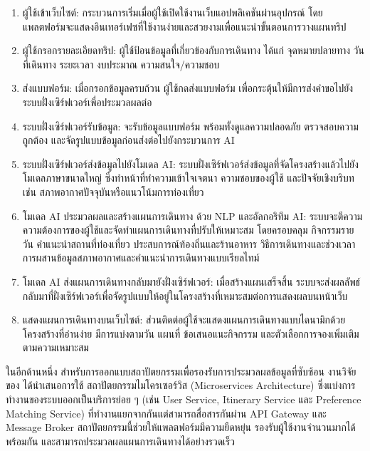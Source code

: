 \begin{enumerate}[label=(\arabic*),leftmargin=0pt,itemindent=\dimexpr\parindent+\parenlabelwidth+1em\relax,align=right,labelwidth=\parenlabelwidth,labelsep=1em]
\item ผู้ใช้เข้าเว็บไซต์: กระบวนการเริ่มเมื่อผู้ใช้เปิดใช้งานเว็บแอปพลิเคชันผ่านอุปกรณ์ โดยแพลตฟอร์มจะแสดงอินเทอร์เฟซที่ใช้งานง่ายและสวยงามเพื่อแนะนำขั้นตอนการวางแผนทริป
\item ผู้ใช้กรอกรายละเอียดทริป: ผู้ใช้ป้อนข้อมูลที่เกี่ยวข้องกับการเดินทาง ได้แก่ จุดหมายปลายทาง วันที่เดินทาง ระยะเวลา งบประมาณ ความสนใจ/ความชอบ
\item ส่งแบบฟอร์ม: เมื่อกรอกข้อมูลครบถ้วน ผู้ใช้กดส่งแบบฟอร์ม เพื่อกระตุ้นให้มีการส่งคำขอไปยังระบบฝั่งเซิร์ฟเวอร์เพื่อประมวลผลต่อ
\item ระบบฝั่งเซิร์ฟเวอร์รับข้อมูล: จะรับข้อมูลแบบฟอร์ม พร้อมทั้งดูแลความปลอดภัย ตรวจสอบความถูกต้อง และจัดรูปแบบข้อมูลก่อนส่งต่อไปยังกระบวนการ AI
\item ระบบฝั่งเซิร์ฟเวอร์ส่งข้อมูลไปยังโมเดล AI: ระบบฝั่งเซิร์ฟเวอร์ส่งข้อมูลที่จัดโครงสร้างแล้วไปยังโมเดลภาษาขนาดใหญ่ ซึ่งทำหน้าที่ทำความเข้าใจเจตนา ความชอบของผู้ใช้ และปัจจัยเชิงบริบท เช่น สภาพอากาศปัจจุบันหรือแนวโน้มการท่องเที่ยว
\item โมเดล AI ประมวลผลและสร้างแผนการเดินทาง ด้วย NLP และอัลกอริทึม AI: ระบบจะตีความความต้องการของผู้ใช้และจัดทำแผนการเดินทางที่ปรับให้เหมาะสม โดยครอบคลุม กิจกรรมรายวัน คำแนะนำสถานที่ท่องเที่ยว ประสบการณ์ท้องถิ่นและร้านอาหาร วิธีการเดินทางและช่วงเวลา การผสานข้อมูลสภาพอากาศและคำแนะนำการเดินทางแบบเรียลไทม์
\item โมเดล AI ส่งแผนการเดินทางกลับมายังฝั่งเซิร์ฟเวอร์: เมื่อสร้างแผนเสร็จสิ้น ระบบจะส่งผลลัพธ์กลับมาที่ฝั่งเซิร์ฟเวอร์เพื่อจัดรูปแบบให้อยู่ในโครงสร้างที่เหมาะสมต่อการแสดงผลบนหน้าเว็บ
\item แสดงแผนการเดินทางบนเว็บไซต์: ส่วนติดต่อผู้ใช้จะแสดงแผนการเดินทางแบบไดนามิกด้วยโครงสร้างที่อ่านง่าย มีการแบ่งตามวัน แผนที่ ข้อเสนอแนะกิจกรรม และตัวเลือกการจองเพิ่มเติมตามความเหมาะสม
\end{enumerate}

ในอีกด้านหนึ่ง สำหรับการออกแบบสถาปัตยกรรมเพื่อรองรับการประมวลผลข้อมูลที่ซับซ้อน งานวิจัยของ \textcite{barua2024} ได้นำเสนอการใช้ สถาปัตยกรรมไมโครเซอร์วิส (Microservices Architecture) ซึ่งแบ่งการทำงานของระบบออกเป็นบริการย่อย ๆ (เช่น User Service, Itinerary Service และ Preference Matching Service) ที่ทำงานแยกจากกันแต่สามารถสื่อสารกันผ่าน API Gateway และ Message Broker สถาปัตยกรรมนี้ช่วยให้แพลตฟอร์มมีความยืดหยุ่น รองรับผู้ใช้งานจำนวนมากได้พร้อมกัน และสามารถประมวลผลแผนการเดินทางได้อย่างรวดเร็ว

